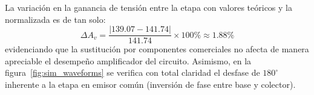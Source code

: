 La variación en la ganancia de tensión entre la etapa con valores teóricos y la normalizada es de tan solo:
\begin{equation}
  \Delta A_v = \frac{|139.07 - 141.74|}{141.74} \times 100\% \approx 1.88\%
\end{equation}
evidenciando que la sustitución por componentes comerciales no afecta de manera apreciable el desempeño amplificador
del circuito. Asimismo, en la figura~\ref{fig:sim_waveforms} se verifica con total claridad el desfase de $180^\circ$
inherente a la etapa en emisor común (inversión de fase entre base y colector).

